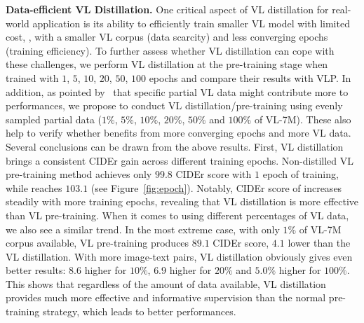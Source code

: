 \vspace{2mm}
\noindent \textbf{Data-efficient VL Distillation.} \label{sec:dataefficient} One critical aspect of VL distillation for real-world application is its ability to efficiently train smaller VL model with limited cost, \ie, with a smaller VL corpus (data scarcity) and less converging epochs (training efficiency). 
To further assess whether VL distillation can cope with these challenges, we perform VL distillation at the pre-training stage when trained with $1$, $5$, $10$, $20$, $50$, $100$ epochs and compare their results with VLP. In addition, as pointed by~\cite{lu202012} that specific partial VL data might contribute more to performances, we propose to conduct VL distillation/pre-training using evenly sampled partial data ($1\%$, $5\%$, $10\%$, $20\%$, $50\%$ and $100\%$ of VL-7M). These also help to verify whether \distillvlm benefits from more converging epochs and more VL data.
Several conclusions can be drawn from the above results. First, VL distillation brings a consistent CIDEr gain across different training epochs. Non-distilled VL pre-training method achieves only $99.8$ CIDEr score with $1$ epoch of training, while \distillvlm reaches $103.1$ (see Figure~\ref{fig:epoch}). Notably, CIDEr score of \distillvlm increases steadily with more training epochs, revealing that VL distillation is more effective than VL pre-training. When it comes to using different percentages of VL data, we also see a similar trend. In the most extreme case, with only $1\%$ of VL-7M corpus available, VL pre-training produces $89.1$ CIDEr score, $4.1$ lower than the VL distillation. With more image-text pairs, VL distillation obviously gives even better results: 
$8.6$ higher for $10\%$, $6.9$ higher for $20\%$ and $5.0\%$ higher for $100\%$.
This shows that regardless of the amount of data available, VL distillation
provides much more effective and informative supervision than the normal pre-training strategy, which leads to better performances.

